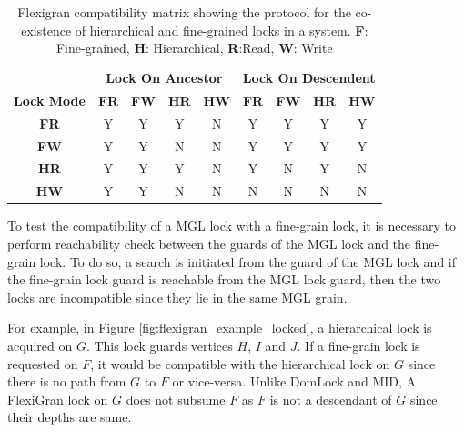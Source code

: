 \begin{table}[h]
    \centering
    \captionsetup{justification=centering}
    \begin{tabular}{c|cccc|cccc|}
        \multicolumn{1}{c}{} & \multicolumn{4}{c|}{\textbf{Lock On Ancestor}} & \multicolumn{4}{c}{\textbf{Lock On Descendent}} \\
        \cline{2-9}
        \textbf{Lock Mode} & \textbf{FR} & \textbf{FW} & \textbf{HR} & \textbf{HW} & \textbf{FR} & \textbf{FW} & \textbf{HR} & \textbf{HW} \\
        \hline
        \textbf{FR} & \cellcolor{green!25} Y & \cellcolor{green!25} Y & \cellcolor{green!25} Y & \cellcolor{red!25} N & \cellcolor{green!25} Y & \cellcolor{green!25} Y & \cellcolor{green!25} Y & \cellcolor{green!25} Y \\
        \textbf{FW} & \cellcolor{green!25} Y & \cellcolor{green!25} Y & \cellcolor{red!25} N & \cellcolor{red!25} N & \cellcolor{green!25} Y & \cellcolor{green!25} Y & \cellcolor{green!25} Y & \cellcolor{green!25} Y \\
        \textbf{HR} & \cellcolor{green!25} Y & \cellcolor{green!25} Y & \cellcolor{green!25} Y & \cellcolor{red!25} N & \cellcolor{green!25} Y & \cellcolor{red!25} N & \cellcolor{green!25} Y & \cellcolor{red!25} N \\
        \textbf{HW} & \cellcolor{green!25} Y & \cellcolor{green!25} Y & \cellcolor{red!25} N & \cellcolor{red!25} N & \cellcolor{red!25} N & \cellcolor{red!25} N & \cellcolor{red!25} N & \cellcolor{red!25} N \\
    \end{tabular}
    \caption{Flexigran compatibility matrix showing the protocol for the co-existence of hierarchical and fine-grained locks in a system. \textbf{F}: Fine-grained, \textbf{H}: Hierarchical, \textbf{R}:Read, \textbf{W}: Write}
    \label{tab:flexigran_locks}
\end{table}

To test the compatibility of a MGL lock with a fine-grain lock, it is necessary to perform reachability check between the guards of the MGL lock and the fine-grain lock. To do so, a search is initiated from the guard of the MGL lock and if the fine-grain lock guard is reachable from the MGL lock guard, then the two locks are incompatible since they lie in the same MGL grain. 

For example, in Figure \ref{fig:flexigran_example_locked}, a hierarchical lock is acquired on $G$. This lock guards vertices $H$, $I$ and $J$. If a fine-grain lock is requested on $F$, it would be compatible with the hierarchical lock on $G$ since there is no path from $G$ to $F$ or vice-versa. Unlike DomLock and MID, A FlexiGran lock on $G$ does not subsume $F$ as $F$ is not a descendant of $G$ since their depths are same.

